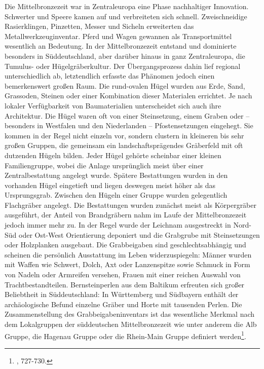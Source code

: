 \documentclass[openany,twoside,twocolumn]{book}
\let\rmarkdownfootnote\footnote%
\def\footnote{\protect\rmarkdownfootnote}
\begin{document}
Die Mittelbronzezeit war in Zentraleuropa eine Phase nachhaltiger Innovation. Schwerter und Speere kamen auf und verbreiteten sich schnell. Zweischneidige Rasierklingen, Pinzetten, Messer und Sicheln erweiterten das Metallwerkzeuginventar. Pferd und Wagen gewannen als Transportmittel wesentlich an Bedeutung. In der Mittelbronzezeit entstand und dominierte besonders in Süddeutschland, aber darüber hinaus in ganz Zentraleuropa, die Tumulus- oder Hügelgräberkultur. Der Übergangsprozess dahin lief regional unterschiedlich ab, letztendlich erfasste das Phänomen jedoch einen bemerkenswert großen Raum. Die rund-ovalen Hügel wurden aus Erde, Sand, Grassoden, Steinen oder einer Kombination dieser Materialen errichtet. Je nach lokaler Verfügbarkeit von Baumaterialien unterscheidet sich auch ihre Architektur. Die Hügel waren oft von einer Steinsetzung, einem Graben oder -- besonders in Westfalen und den Niederlanden -- Pfostensetzungen eingehegt. Sie kommen in der Regel nicht einzeln vor, sondern clustern in kleineren bis sehr großen Gruppen, die gemeinsam ein landschaftsprägendes Gräberfeld mit oft dutzenden Hügeln bilden. Jeder Hügel gehörte scheinbar einer kleinen Familiengruppe, wobei die Anlage ursprünglich meist über einer Zentralbestattung angelegt wurde. Spätere Bestattungen wurden in den vorhanden Hügel eingetieft und liegen deswegen meist höher als das Ursprungsgrab. Zwischen den Hügeln einer Gruppe wurden gelegentlich Flachgräber angelegt. Die Bestattungen wurden zunächst meist als Körpergräber ausgeführt, der Anteil von Brandgräbern nahm im Laufe der Mittelbronzezeit jedoch immer mehr zu. In der Regel wurde der Leichnam ausgestreckt in Nord-Süd oder Ost-West Orientierung deponiert und die Grabgrube mit Steinsetzungen oder Holzplanken ausgebaut. Die Grabbeigaben sind geschlechtsabhängig und scheinen die persönlich Ausstattung im Leben widerzuspiegeln: Männer wurden mit Waffen wie Schwert, Dolch, Axt oder Lanzenspitze sowie Schmuck in Form von Nadeln oder Armreifen versehen, Frauen mit einer reichen Auswahl von Trachtbestandteilen. Bernsteinperlen aus dem Baltikum erfreuten sich großer Beliebtheit in Süddeutschland: In Württemberg und Südbayern enthält der archäologische Befund einzelne Gräber und Horte mit tausenden Perlen. Die Zusammenstellung des Grabbeigabeninventars ist das wesentliche Merkmal nach dem Lokalgruppen der süddeutschen Mittelbronzezeit wie unter anderem die Alb Gruppe, die Hagenau Gruppe oder die Rhein-Main Gruppe definiert werden\footnote{\textcite{jockenhovel_germany_2013}, 727-730.}.
\end{document}
